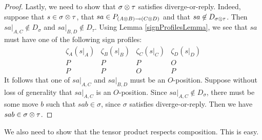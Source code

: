 \documentclass{article}
\begin{document}
\begin{proposition}
\begin{proof}
    Lastly, we need to show that $\sigma\otimes\tau$ satisfies diverge-or-reply.  Indeed, suppose that $s\in\sigma\otimes\tau$, that $sa\in P_{(A\otimes B)\multimap (C\otimes D)}$ and that $sa\not\in D_{\sigma\otimes\tau}$.  Then $sa\vert_{A,C}\not\in D_\sigma$ and $sa\vert_{B,D}\not\in D_\tau$.  Using Lemma \ref{signProfilesLemma}, we see that $sa$ must have one of the following sign profiles:
    \[
      \begin{array}{cccc}
        \zeta_A(s\vert_A) & \zeta_B(s\vert_B) & \zeta_C(s\vert_C) & \zeta_D(s\vert_D) \\
        \hline
        P & P & P & O \\
        P & P & O & P
      \end{array}
      \]
    It follows that one of $sa\vert_{A,C}$ and $sa\vert_{B,D}$ must be an $O$-position.  Suppose without loss of generality that $sa\vert_{A,C}$ is an $O$-position.  Since $sa\vert_{A,C}\not\in D_\sigma$, there must be some move $b$ such that $sab\in\sigma$, since $\sigma$ satisfies diverge-or-reply.  Then we have $sab\in\sigma\otimes\tau$.
  \end{proof}
\end{proposition}

We also need to show that the tensor product respects composition.  This is easy.
\end{document}

